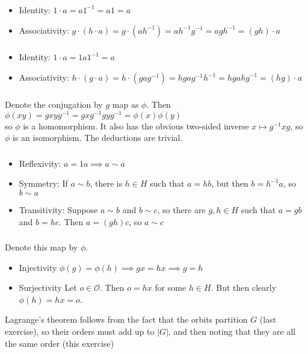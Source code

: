 \documentclass{article}
\newcommand{\inv}[1]{ {#1}^{-1} }
\newcommand{\sheaf}{ \mathcal{O} }
\begin{document}
\subsubsection{}\label{ex7p15}
\begin{itemize}
\item Identity: $1\cdot a = a\inv{1} = a1 = a$
\item Associativity: $g\cdot(h\cdot a) = g\cdot(a\inv{h})=a\inv{h}\inv{g} = a\inv{gh} = (gh)\cdot a$
\end{itemize}
\subsubsection{}\label{ex7p16}
\begin{itemize}
\item Identity: $1\cdot a = 1a\inv{1} = a$
\item Associativity: $h\cdot(g\cdot a) = h\cdot (ga\inv{g}) = hga\inv{g}\inv{h} = hga\inv{hg} = (hg)\cdot a$
\end{itemize}
\subsubsection{}\label{ex7p17}
Denote the conjugation by $g$ map as $\phi$. Then\\
$\phi(xy)=gxy\inv{g}=gx\inv{g}gy\inv{g}=\phi(x)\phi(y)$\\
so $\phi$ is a homomorphism. It also has the obvious two-sided inverse $x \mapsto \inv{g}xg$, so $\phi$ is an isomorphism. The deductions are trivial.
\subsubsection{}\label{ex7p18}
\begin{itemize}
\item Reflexivity: $a = 1a \implies a \sim a$
\item Symmetry: If $a \sim b$, there is $h \in H$ such that $a=hb$, but then $b=\inv{h}a$, so $b \sim a$
\item Transitivity: Suppose $a\sim b$ and $b\sim c$, so there are $g,h\in H$ such that $a=gb$ and $b=hc$. Then $a=(gh)c$, so $a \sim c$
\end{itemize}
\subsubsection{}\label{ex7p19}
Denote this map by $\phi$. 
\begin{itemize}
\item Injectivity $\phi(g)=\phi(h)\implies gx=hx \implies g=h$
\item Surjectivity Let $o \in \sheaf$. Then $o=hx$ for some $h\in H$. But then clearly $\phi(h) = hx = o$.
\end{itemize}
Lagrange's theorem follows from the fact that the orbits partition $G$ (last exercise), so their orders must add up to $|G|$, and then noting that they are all the same order (this exercise)
\end{document}
